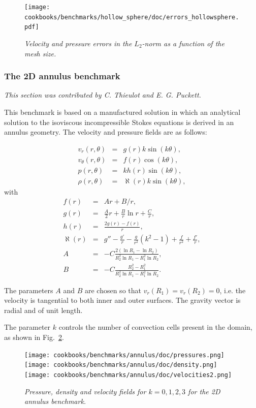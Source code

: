 \documentclass{article}
\begin{document}
\begin{figure}
\centering
\texttt{[image: cookbooks/benchmarks/hollow\_sphere/doc/errors\_hollowsphere.pdf]}
\caption{\it Velocity and pressure errors in the $L_2$-norm as a function of the mesh size.}
\label{fig:hollow-sphere-errors}
\end{figure}


\subsubsection{The 2D annulus benchmark}
\label{sec:cookbooks-annulus}

\textit{This section was contributed by C. Thieulot and E. G. Puckett.}

This benchmark is based on a manufactured solution in which an analytical solution to the
isoviscous incompressible Stokes equations is derived in an annulus geometry.
The velocity and pressure fields are as follows:

\begin{eqnarray}
v_r(r,\theta)     &=&  g(r) k \sin(k\theta), \\
v_\theta(r,\theta)&=&  f(r) \cos(k \theta), \\
p(r,\theta)       &=&  k h(r) \sin(k \theta), \\
\rho (r,\theta)   &=& \aleph(r) k \sin (k \theta),
\end{eqnarray}
with
\begin{eqnarray}
f(r)&=&Ar+B/r, \\
g(r) &=& \frac{A}{2}r  +  \frac{B}{r} \ln r + \frac{C}{r}, \\
h(r)&=& \frac{2g(r)-f(r)}{r},  \\
\aleph(r) &=& g'' - \frac{g'}{r}  - \frac{g}{r^2} (k^2 - 1)  + \frac{f}{r^2}   + \frac{f'}{r}, \\
A &=& -C\frac{2(\ln R_1 - \ln R_2)} { R_2^2 \ln R_1  - R_1^2 \ln R_2}, \\
B &=& -C \frac{R_2^2-R_1^2}{R_2^2 \ln R_1 - R_1^2 \ln R_2}.
\end{eqnarray}

The parameters $A$ and $B$ are chosen so that $v_r(R_1)=v_r(R_2)=0$, i.e.
the velocity is tangential to both inner and outer surfaces.
The gravity vector is radial and of unit length.

The parameter $k$ controls the number of convection cells present in the domain,
as shown in Fig.~\ref{fig:annulus-vp}.

\begin{figure}
\centering
\texttt{[image: cookbooks/benchmarks/annulus/doc/pressures.png]}
\texttt{[image: cookbooks/benchmarks/annulus/doc/density.png]}
\texttt{[image: cookbooks/benchmarks/annulus/doc/velocities2.png]}
\caption{\it Pressure, density and velocity fields for $k=0,1,2,3$ for the 2D annulus benchmark.}
\label{fig:annulus-vp}
\end{figure}
\end{document}
